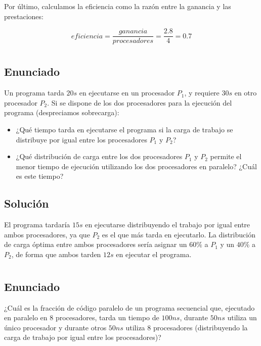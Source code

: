 Por último, calculamos la eficiencia como la razón entre la ganancia y las prestaciones:

\[eficiencia=\frac{ganancia}{procesadores}=\frac{2.8}{4}=0.7\]

\section{}\label{ej-2-8}

\subsection{Enunciado}

Un programa tarda $20s$ en ejecutarse en un procesador $P_1$, y requiere $30s$ en otro procesador $P_2$.
Si se dispone de los dos procesadores para la ejecución del programa (despreciamos sobrecarga):

\begin{itemize}
	\item ¿Qué tiempo tarda en ejecutarse el programa si la carga de trabajo se distribuye por igual entre los procesadores $P_1$ y $P_2$?
	\item ¿Qué distribución de carga entre los dos procesadores $P_1$ y $P_2$ permite el menor tiempo de
ejecución utilizando los dos procesadores en paralelo? ¿Cuál es este tiempo?
\end{itemize}

\subsection{Solución}

El programa tardaría $15s$ en ejecutarse distribuyendo el trabajo por igual entre ambos procesadores, ya que $P_2$ es el que más tarda en ejecutarlo.
La distribución de carga óptima entre ambos procesadores sería asignar un $60\%$ a $P_1$ y un $40\%$ a $P_2$, de forma que ambos tarden $12s$ en ejecutar el programa.

\section{}\label{ej-2-9}

\subsection{Enunciado}

¿Cuál es la fracción de código paralelo de un programa secuencial que, ejecutado en paralelo en $8$ procesadores, tarda un tiempo de $100ns$, durante $50ns$ utiliza un único procesador y durante otros $50ns$ utiliza $8$ procesadores (distribuyendo la carga de trabajo por igual entre los procesadores)?

